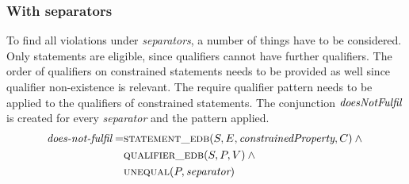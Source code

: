 \documentclass[hyperref,bachelorofscience,fleqn]{cgvpub}
\begin{document}
\subsubsection{With separators}\label{subsubsec_single_value_with_separators}
To find all violations under \emph{separators}, a number of things have to be considered. Only statements are eligible, since qualifiers cannot have further qualifiers. The order of qualifiers on constrained statements needs to be provided as well since qualifier non-existence is relevant. The require qualifier pattern needs to be applied to the qualifiers of constrained statements. The conjunction \(\emph{doesNotFulfil}\) is created for every \emph{separator} and the pattern applied.
\begin{equation}
\begin{split}
\emph{does-not-fulfil} = &\textsc{statement\_edb}(S, E, \emph{constrainedProperty}, C) \wedge{} \\
&\textsc{qualifier\_edb}(S, P, V) \wedge{} \\
&\textsc{unequal}(P, \emph{separator})
\end{split}
\end{equation}
\end{document}
